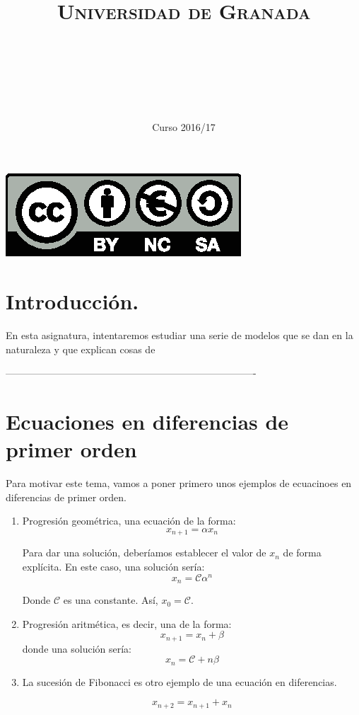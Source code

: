 \documentclass[11pt, a4paper, titlepage]{article}
\title{
  \normalfont \normalsize 
  \textsc{Universidad de Granada} \\ [25pt]    %
  \horrule{0.5pt} \\[0.4cm] %
  \huge \subject\\ %
  \horrule{2pt} \\[0.5cm] %
}
\author{\Large{\docauthor}}
\date{\vspace{-1.5em} \normalsize Curso 2016/17}
\theoremstyle{theorem-style}
\theoremstyle{definition-style}
\theoremstyle{remark-style}
\theoremstyle{example-style}
\begin{document}
\maketitle  %
\tableofcontents    %
\vfill
\begin{center}
\includegraphics{../Recursos/Plantillas/by-nc-sa.eps}  %
\end{center}
\newpage


\section*{Introducción.}
En esta asignatura, intentaremos estudiar una serie de modelos que se dan en la naturaleza y que explican cosas de 

----------------------------------------------------------------------------


\newpage

\section{Ecuaciones en diferencias de primer orden}

Para motivar este tema, vamos a poner primero unos ejemplos de ecuacinoes en diferencias de primer orden.

\begin{enumerate}
	\item Progresión geométrica, una ecuación de la forma:
\[
x_{n+1} =  \alpha x_n
\]

Para dar una solución, deberíamos establecer el valor de $x_n$ de forma explícita. En este caso, una solución sería:
\[
x_n = \mathcal{C} \alpha^n
\]

Donde $\mathcal{C}$ es una constante. Así, $x_0 = \mathcal{C}$.

\item Progresión aritmética, es decir, una de la forma:
\[
x_{n+1} = x_n + \beta
\]
donde una solución sería:
\[
x_n = \mathcal{C} + n\beta
\]

\item La sucesión de Fibonacci es otro ejemplo de una ecuación en diferencias.

\[
x_{n+2} = x_{n+1} + x_{n}
\]

\end{enumerate}
\end{document}
